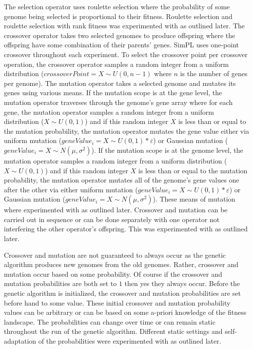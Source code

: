 \documentclass[a4paper,10pt]{article}
\begin{document}
\vspace{3mm}

The selection operator uses roulette selection where the probability of some genome being selected is proportional to their fitness. Roulette selection and roulette selection with rank fitness was experimented with as outlined later. The crossover operator takes two selected genomes to produce offspring where the offspring have some combination of their parents' genes. SimPL uses one-point crossover throughout each experiment. To select the crossover point per crossover operation, the crossover operator samples a random integer from a uniform distribution ($crossoverPoint = X\!\sim\!U(0,n-1)$ where $n$ is the number of genes per genome). The mutation operator takes a selected genome and mutates its genes using various means. If the mutation scope is at the gene level, the mutation operator traverses through the genome's gene array where for each gene, the mutation operator samples a random integer from a uniform distribution ($X\!\sim\!U(0,1)$) and if this random integer $X$ is less than or equal to the mutation probability, the mutation operator mutates the gene value either via uniform mutation ($geneValue_i = X\!\sim\!U(0,1) * \varepsilon$) or Gaussian mutation ($geneValue_i = X\!\sim\!N(\mu,\sigma^2)$). If the mutation scope is at the genome level, the mutation operator samples a random integer from a uniform distribution ($X\sim U(0,1)$) and if this random integer $X$ is less than or equal to the mutation probability, the mutation operator mutates all of the genome's gene values one after the other via either uniform mutation ($geneValue_i = X\!\sim\!U(0,1) * \varepsilon$) or Gaussian mutation ($geneValue_i = X\!\sim\!N(\mu,\sigma^2)$). These means of mutation where experimented with as outlined later. Crossover and mutation can be carried out in sequence or can be done separately with one operator not interfering the other operator's offspring. This was experimented with as outlined later.

Crossover and mutation are not guaranteed to always occur as the genetic algorithm produces new genomes from the old genomes. Rather, crossover and mutation occur based on some probability. Of course if the crossover and mutation probabilities are both set to $1$ then yes they always occur. Before the genetic algorithm is initialized, the crossover and mutation probabilities are set before hand to some value. These initial crossover and mutation probability values can be arbitrary or can be based on some a-priori knowledge of the fitness landscape. The probabilities can change over time or can remain static throughout the run of the genetic algorithm. Different static settings and self-adaptation of the probabilities were experimented with as outlined later. 
\end{document}
